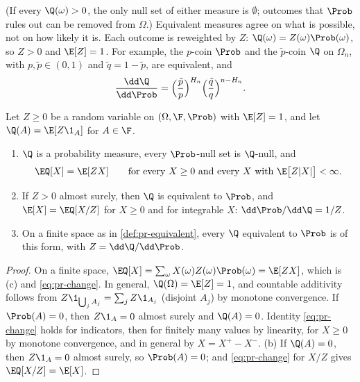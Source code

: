 (If every $\Q(\omega)>0$, the only null set of either measure is $\emptyset$; outcomes that
$\Prob$ rules out can be removed from $\Omega$.) Equivalent measures agree on what is
possible, not on how likely it is. Each outcome is reweighted by $Z$:
$\Q(\omega)=Z(\omega)\Prob(\omega)$, so $Z>0$ and $\E[Z]=1$. For example,
the $p$-coin $\Prob$ and the $\tilde p$-coin $\Q$ on $\Omega_n$, with $p,\tilde p\in(0,1)$ and
$\tilde q=1-\tilde p$, are equivalent, and
\begin{equation}\label{eq:pr-coin-density}
  \frac{\dd\Q}{\dd\Prob}=\Big(\frac{\tilde p}{p}\Big)^{H_n}\Big(\frac{\tilde q}{q}\Big)^{n-H_n}.
\end{equation}

\begin{proposition}\label{prop:pr-change-of-measure}
Let $Z\ge0$ be a random variable on $(\Omega,\F,\Prob)$ with $\E[Z]=1$, and let
$\Q(A)=\E[Z\1_A]$ for $A\in\F$.
\begin{enumerate}[label=(\alph*)]
  \item $\Q$ is a probability measure, every $\Prob$-null set is $\Q$-null, and
    \begin{equation}\label{eq:pr-change}
      \EQ[X]=\E[ZX]\qquad\text{for every }X\ge0\text{ and every }X\text{ with }\E\big[Z|X|\big]<\infty .
    \end{equation}
  \item If $Z>0$ almost surely, then $\Q$ is equivalent to $\Prob$, and $\E[X]=\EQ[X/Z]$ for
    $X\ge0$ and for integrable $X$: $\dd\Prob/\dd\Q=1/Z$.
  \item On a finite space as in \cref{def:pr-equivalent}, every $\Q$ equivalent to $\Prob$ is of
    this form, with $Z=\dd\Q/\dd\Prob$.
\end{enumerate}
\end{proposition}

\begin{proof}
On a finite space, $\EQ[X]=\sum_\omega X(\omega)Z(\omega)\Prob(\omega)=\E[ZX]$, which is
(c) and \eqref{eq:pr-change}. In general, $\Q(\Omega)=\E[Z]=1$, and countable additivity
follows from $Z\1_{\bigcup_jA_j}=\sum_jZ\1_{A_j}$ (disjoint $A_j$) by monotone
convergence. If $\Prob(A)=0$, then $Z\1_A=0$ almost surely and $\Q(A)=0$. Identity
\eqref{eq:pr-change} holds for indicators, then for finitely many values by linearity, for
$X\ge0$ by monotone convergence, and in general by $X=X^+-X^-$. (b) If $\Q(A)=0$, then
$Z\1_A=0$ almost surely, so $\Prob(A)=0$; and \eqref{eq:pr-change} for $X/Z$ gives
$\EQ[X/Z]=\E[X]$.
\end{proof}

